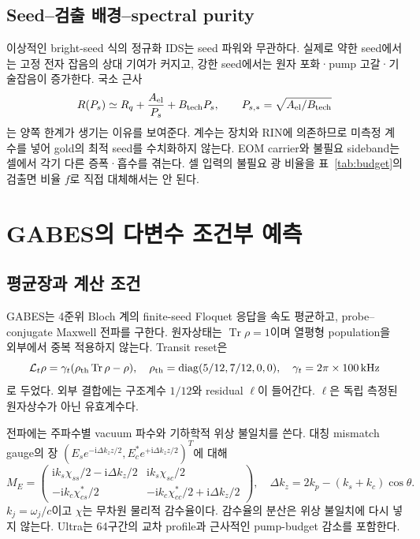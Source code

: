 \documentclass[11pt,a4paper]{article}
\newcommand{\kHz}{\,\mathrm{kHz}}
\newcommand{\Tr}{\operatorname{Tr}}
\newcommand{\ii}{\mathrm i}
\begin{document}
\subsection{Seed--검출 배경--spectral purity}
이상적인 bright-seed 식의 정규화 IDS는 seed 파워와 무관하다.
실제로 약한 seed에서는 고정 전자 잡음의 상대 기여가 커지고, 강한 seed에서는
원자 포화·pump 고갈·기술잡음이 증가한다. 국소 근사
\begin{equation}
 R(P_s)\simeq R_q+\frac{A_{\rm el}}{P_s}+B_{\rm tech}P_s,\qquad
 P_{s,*}=\sqrt{A_{\rm el}/B_{\rm tech}}
\end{equation}
는 양쪽 한계가 생기는 이유를 보여준다. 계수는 장치와 RIN에 의존하므로
미측정 계수를 넣어 gold의 최적 seed를 수치화하지 않는다.
EOM carrier와 불필요 sideband는 셀에서 각기 다른 증폭·흡수를 겪는다.
셀 입력의 불필요 광 비율을 표~\ref{tab:budget}의 검출면 비율 $f$로
직접 대체해서는 안 된다.

\section{GABES의 다변수 조건부 예측}
\subsection{평균장과 계산 조건}
GABES는 4준위 Bloch 계의 finite-seed Floquet 응답을 속도 평균하고,
probe--conjugate Maxwell 전파를 구한다. 원자상태는 $\Tr\rho=1$이며
열평형 population을 외부에서 중복 적용하지 않는다. Transit reset은
\begin{equation}
 \mathcal L_t\rho=\gamma_t(\rho_{\rm th}\Tr\rho-\rho),\quad
 \rho_{\rm th}=\operatorname{diag}(5/12,7/12,0,0),\quad
 \gamma_t=2\pi\times100\kHz
\end{equation}
로 두었다. 외부 결합에는 구조계수 $1/12$와 residual $\ell$이 들어간다.
$\ell$은 독립 측정된 원자상수가 아닌 유효계수다.

전파에는 주파수별 vacuum 파수와 기하학적 위상 불일치를 쓴다.
대칭 mismatch gauge의 장
$(E_se^{-\ii\Delta k_zz/2},E_c^*e^{+\ii\Delta k_zz/2})^T$에 대해
\begin{equation}
 M_E=\begin{pmatrix}
 \ii k_s\chi_{ss}/2-\ii\Delta k_z/2&\ii k_s\chi_{sc}/2\\
 -\ii k_c\chi_{cs}^*/2&-\ii k_c\chi_{cc}^*/2+\ii\Delta k_z/2
 \end{pmatrix},\quad \Delta k_z=2k_p-(k_s+k_c)\cos\theta .
\end{equation}
$k_j=\omega_j/c$이고 $\chi$는 무차원 물리적 감수율이다. 감수율의
분산은 위상 불일치에 다시 넣지 않는다. Ultra는 64구간의 교차 profile과
근사적인 pump-budget 감소를 포함한다.
\end{document}
